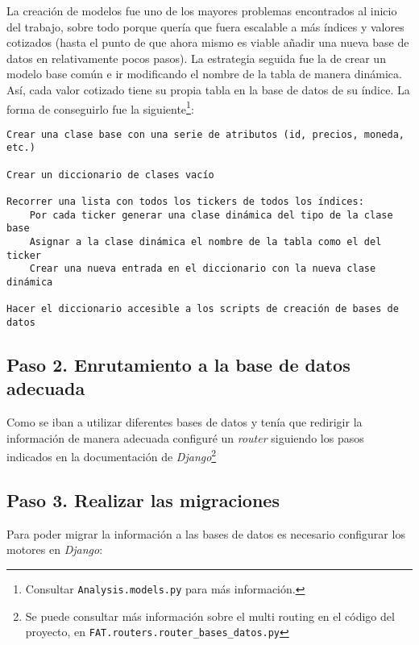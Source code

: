 La creación de modelos fue uno de los mayores problemas encontrados al inicio del trabajo, sobre todo porque quería que  fuera escalable a más índices y valores cotizados (hasta el punto de que ahora mismo es viable añadir una nueva base de datos en relativamente pocos pasos). La estrategia seguida fue la de crear un modelo base común e ir modificando el nombre de la tabla de manera dinámica. Así, cada valor cotizado tiene su propia tabla en la base de datos de su índice. La forma de conseguirlo fue la siguiente\footnote{Consultar \texttt{Analysis.models.py} para más información.}: 

\begin{verbatim}
Crear una clase base con una serie de atributos (id, precios, moneda, etc.)

Crear un diccionario de clases vacío

Recorrer una lista con todos los tickers de todos los índices:
    Por cada ticker generar una clase dinámica del tipo de la clase base
	Asignar a la clase dinámica el nombre de la tabla como el del ticker    
	Crear una nueva entrada en el diccionario con la nueva clase dinámica

Hacer el diccionario accesible a los scripts de creación de bases de datos
\end{verbatim}

\subsection{Paso 2. Enrutamiento a la base de datos adecuada}

Como se iban a utilizar diferentes bases de datos y tenía que redirigir la información de manera adecuada configuré un \emph{router} siguiendo los pasos indicados en la documentación de \emph{Django}\citep{online:django_routers}\footnote{Se puede consultar más información sobre el multi routing en el código del proyecto, en \texttt{FAT.routers.router\_bases\_datos.py}}

\subsection{Paso 3. Realizar las migraciones}

Para poder migrar la información a las bases de datos es necesario configurar los motores en \emph{Django}:

